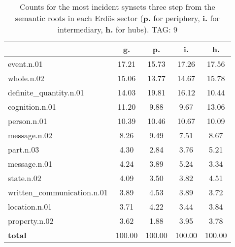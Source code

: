\begin{table}[h!]
\begin{center}
\begin{tabular}{| l | c | c | c | c |}\hline
 & g. & p. & i. & h. \\\hline
event.n.01 & 17.21  & 15.73  & 17.26  & 17.56 \\\hline
whole.n.02 & 15.06  & 13.77  & 14.67  & 15.78 \\\hline
definite\_quantity.n.01 & 14.03  & 19.81  & 16.12  & 10.44 \\\hline
cognition.n.01 & 11.20  & 9.88  & 9.67  & 13.06 \\\hline
person.n.01 & 10.39  & 10.46  & 10.67  & 10.09 \\\hline
message.n.02 & 8.26  & 9.49  & 7.51  & 8.67 \\\hline
part.n.03 & 4.30  & 2.84  & 3.76  & 5.21 \\\hline
message.n.01 & 4.24  & 3.89  & 5.24  & 3.34 \\\hline
state.n.02 & 4.09  & 3.50  & 3.82  & 4.51 \\\hline
written\_communication.n.01 & 3.89  & 4.53  & 3.89  & 3.72 \\\hline
location.n.01 & 3.71  & 4.22  & 3.44  & 3.84 \\\hline
property.n.02 & 3.62  & 1.88  & 3.95  & 3.78 \\\hline
{{\bf total}} & 100.00  & 100.00  & 100.00  & 100.00 \\\hline
\end{tabular}
\caption{Counts for the most incident synsets three step from the semantic roots in each Erd\"os sector ({\bf p.} for periphery, {\bf i.} for intermediary, {\bf h.} for hubs). TAG: 9}
\end{center}
\end{table}